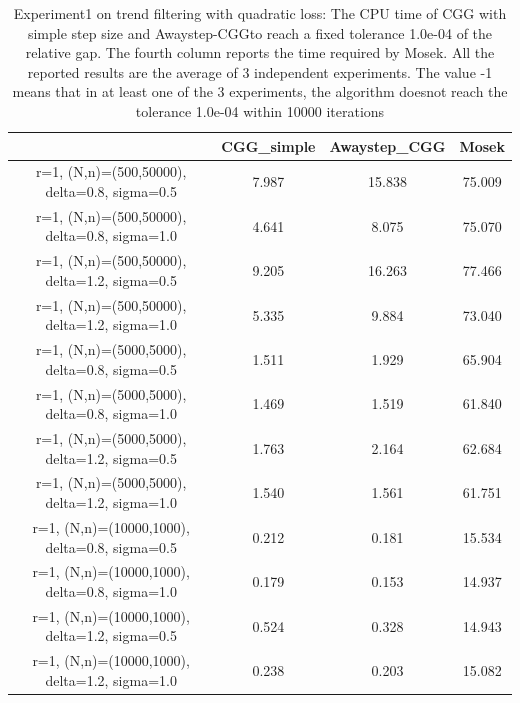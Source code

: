 \documentclass[english]{article}
\begin{document}
\begin{table}[H]
	\centering
	\label{Table_exp1}
	\begin{tabular}{cccc}
		\toprule
		{} &  CGG\_simple &  Awaystep\_CGG &  Mosek \\
		\midrule
		r=1, (N,n)=(500,50000), delta=0.8, sigma=0.5  &       7.987 &        15.838 & 75.009 \\
		r=1, (N,n)=(500,50000), delta=0.8, sigma=1.0  &       4.641 &         8.075 & 75.070 \\
		r=1, (N,n)=(500,50000), delta=1.2, sigma=0.5  &       9.205 &        16.263 & 77.466 \\
		r=1, (N,n)=(500,50000), delta=1.2, sigma=1.0  &       5.335 &         9.884 & 73.040 \\
		r=1, (N,n)=(5000,5000), delta=0.8, sigma=0.5  &       1.511 &         1.929 & 65.904 \\
		r=1, (N,n)=(5000,5000), delta=0.8, sigma=1.0  &       1.469 &         1.519 & 61.840 \\
		r=1, (N,n)=(5000,5000), delta=1.2, sigma=0.5  &       1.763 &         2.164 & 62.684 \\
		r=1, (N,n)=(5000,5000), delta=1.2, sigma=1.0  &       1.540 &         1.561 & 61.751 \\
		r=1, (N,n)=(10000,1000), delta=0.8, sigma=0.5 &       0.212 &         0.181 & 15.534 \\
		r=1, (N,n)=(10000,1000), delta=0.8, sigma=1.0 &       0.179 &         0.153 & 14.937 \\
		r=1, (N,n)=(10000,1000), delta=1.2, sigma=0.5 &       0.524 &         0.328 & 14.943 \\
		r=1, (N,n)=(10000,1000), delta=1.2, sigma=1.0 &       0.238 &         0.203 & 15.082 \\
		\bottomrule
	\end{tabular}
	\caption{Experiment1 on trend filtering with quadratic loss: The CPU time of CGG with simple step size and Awaystep-CGGto reach a fixed tolerance 1.0e-04 of the relative gap. The fourth column reports the time required by Mosek. All the reported results are the average of 3 independent experiments. The value -1 means that in at least one of the 3 experiments, the algorithm doesnot reach the tolerance 1.0e-04 within 10000 iterations}
\end{table}
\end{document}
